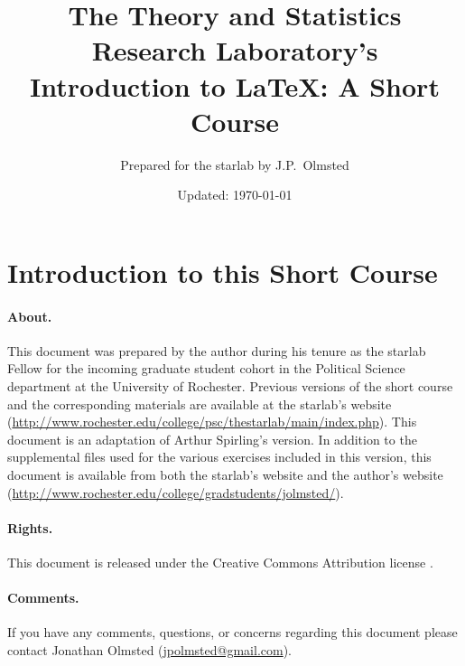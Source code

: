 \documentclass[10wpt,letterpaper]{article}
\author{Prepared for the starlab by J.P.\ Olmsted}
\title{The Theory and Statistics Research
  Laboratory's Introduction to \LaTeX{}: A Short Course}
\date{Updated: \today}
\begin{document}
\begin{titlepage}
\maketitle 
\tableofcontents
\end{titlepage}

\section*{Introduction to this Short Course}

\paragraph{About.}This document was prepared by the author during his tenure as the
starlab Fellow for the incoming graduate student cohort in the
Political Science department at the University of Rochester. Previous
versions of the short course and the corresponding materials are
available at the starlab's website
(\url{http://www.rochester.edu/college/psc/thestarlab/main/index.php}). This
document is an adaptation of Arthur Spirling's version. In addition to
the supplemental files used for the various exercises included in this
version, this document is available from both the starlab's website
and the author's website
(\url{http://www.rochester.edu/college/gradstudents/jolmsted/}).

\paragraph{Rights.}This document is released under the Creative
Commons Attribution license \by.

\paragraph{Comments.}If you have any comments, questions, or concerns
regarding this document please contact Jonathan Olmsted
(\url{jpolmsted@gmail.com}).

\pagebreak

 

\clearpage
\pagebreak



\clearpage
\pagebreak



\clearpage
\pagebreak



\clearpage
\pagebreak



\clearpage



\end{document}
